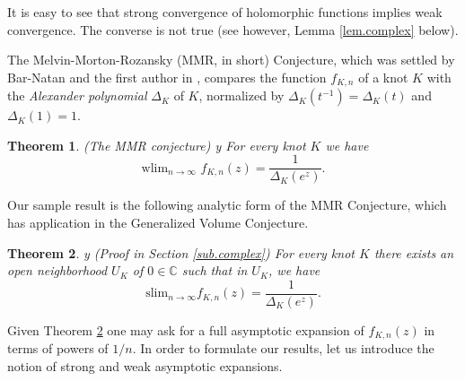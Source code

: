 \documentclass{amsart}
\newtheorem{theorem}{Theorem}[section]
\theoremstyle{definition}
\def\printname#1{
    \if\draft y
        \smash{\makebox[0pt]{\hspace{-0.5in}
            \raisebox{8pt}{\tt\tiny #1}}}
    \fi
}
\def\lbl#1{\label{#1}\printname{#1}}
\def\BC{\mathbb C}
\def\D{\Delta}
\def\slim{\mathrm{slim}}
\def\wlim{\mathrm{wlim}}
\begin{document}
It is easy to see that strong convergence of holomorphic functions
implies weak convergence. The converse is not true (see however, Lemma
\ref{lem.complex} below).

The Melvin-Morton-Rozansky (MMR, in short) Conjecture, which was
settled by Bar-Natan and the first author in \cite{B-NG}, compares
the function $f_{K,n}$ of a knot $K$ with the {\em Alexander
polynomial} $\D_K$ of $K$, normalized by $\D_K(t^{-1})= \D_K(t)$ and
$\D_K(1)=1$.


\begin{theorem}{\rm (The MMR conjecture)}
\lbl{thm.MMR}\cite{B-NG}
For every knot $K$ we have
\begin{equation*}
\wlim_{n \to \infty} \,\, f_{K,n}(z) = \frac{1}{\D_K(e^{z})} .
\end{equation*}
\end{theorem}

Our sample result is the following  analytic form of the MMR
Conjecture, which has application in the Generalized Volume
Conjecture.

\begin{theorem}
\lbl{thm.11} {\rm (Proof in Section \ref{sub.complex})}
For every knot $K$ there exists an open neighborhood
$U_K$ of $0 \in \BC$ such that in $U_K$, we have
\begin{equation*}
\slim_{n\to\infty} f_{K,n}(z)=\frac{1}{\D_K(e^{z})}.
\end{equation*}
\end{theorem}

Given Theorem \ref{thm.11} one may ask for a full asymptotic
expansion of  $f_{K,n}(z)$ in terms of powers of $1/n$. In order to
formulate our results, let us introduce the notion of strong and
weak asymptotic expansions.
\end{document}
